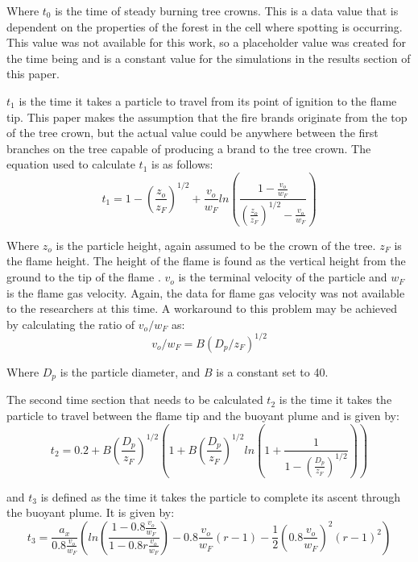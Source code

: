 Where $t_0$ is the time of steady burning tree crowns. This is a data value that is dependent on the properties of the forest in the cell where spotting is occurring. This value was not available for this work, so a placeholder value was created for the time being and is a constant value for the simulations in the results section of this paper. 

$t_1$ is the time it takes a particle to travel from its point of ignition to the flame tip. This paper makes the assumption that the fire brands originate from the top of the tree crown, but the actual value could be anywhere between the first branches on the tree capable of producing a brand to the tree crown. The equation used to calculate $t_1$ is as follows: 
\begin{equation}
t_1 = 1 - (\frac{z_o}{z_F})^{1/2} + \frac{v_o}{w_F}ln(\frac{1-\frac{v_o}{w_F}}{(\frac{z_o}{z_F})^{1/2} - \frac{v_o}{w_F}})
\end{equation}

Where $z_o$ is the particle height, again assumed to be the crown of the tree. $z_F$ is the flame height. The height of the flame is found as the vertical height from the ground to the tip of the flame \cite{firebehaveref}. $v_o$ is the terminal velocity of the particle and $w_F$ is the flame gas velocity. Again, the data for flame gas velocity was not available to the researchers at this time. A workaround to this problem may be achieved by calculating the ratio of $v_o / w_F$ as:  
\begin{equation}
v_o/w_F = B(D_p/z_F)^{1/2}
\end{equation}

Where $D_p$ is the particle diameter, and $B$ is a constant set to 40. 

The second time section that needs to be calculated $t_2$ is the time it takes the particle to travel between the flame tip and the buoyant plume and is given by: 
\begin{equation}
t_2 = 0.2 + B(\frac{D_p}{z_F})^{1/2}(1 + B(\frac{D_p}{z_F})^{1/2}ln(1 + \frac{1}{1-(\frac{D_p}{z_F})^{1/2}}))
\end{equation}

and $t_3$ is defined as the time it takes the particle to complete its ascent through the buoyant plume. It is given by: 
\begin{equation}
t_3 = \frac{a_x}{0.8\frac{v_o}{w_F}}(ln(\frac{1 - 0.8 \frac{v_o}{w_F}}{1 - 0.8r \frac{v_o}{w_F}}) - 0.8\frac{v_o}{w_F}(r-1) - \frac{1}{2}(0.8\frac{v_o}{w_F})^2(r-1)^2)
\end{equation}

